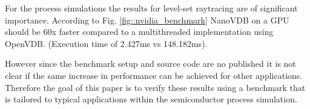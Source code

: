 For the process simulations the results for level-set raytracing are of significant importance. 
According to Fig. \ref{fig::nvidia_benchmark} NanoVDB on a GPU should be 60x faster compared to a multithreaded implementation using OpenVDB. (Execution time of 2.427ms vs 148.182ms).

However since the benchmark setup and source code are no published it is not clear if the same increase in performance can be achieved for other applications.
Therefore the goal of this paper is to verify these results using a benchmark that is tailored to typical applications within the semiconductor process simulation.

